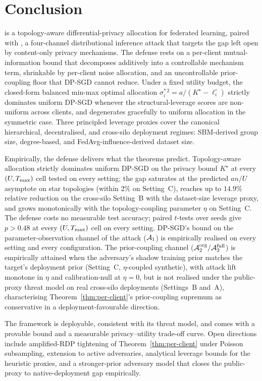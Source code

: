 \section{Conclusion}
\label{sec:conclusion}

\Fulcrum is a topology-aware differential-privacy allocation for
federated learning, paired with \TADI, a four-channel distributional
inference attack that targets the gap left open by content-only privacy
mechanisms. The defense rests on a per-client mutual-information bound
that decomposes additively into a controllable mechanism term,
shrinkable by per-client noise allocation, and an uncontrollable
prior-coupling floor that DP-SGD cannot reduce. Under a fixed utility
budget, the closed-form balanced min-max optimal allocation
$\sigma_i^{*\,2} = a/(K^\star - \ell_i^\circ)$ strictly dominates
uniform DP-SGD whenever the structural-leverage scores are non-uniform
across clients, and degenerates gracefully to uniform allocation in the
symmetric case. Three principled leverage proxies cover the canonical hierarchical,
decentralised, and cross-silo deployment regimes: SBM-derived group
size, degree-based, and FedAvg-influence-derived dataset size.

Empirically, the defense delivers what the theorems predict.
Topology-aware allocation strictly dominates uniform DP-SGD on the
privacy bound $K^\star$ at every $(U, T_{\max})$ cell tested on every
setting; the gap saturates at the predicted $an/U$ asymptote on
star topologies (within 2\% on Setting~C), reaches up to $14.9\%$
relative reduction on the cross-silo Setting~B with the dataset-size
leverage proxy, and grows monotonically with the topology-coupling
parameter $\eta$ on Setting~C. The defense costs no measurable test
accuracy; paired $t$-tests over seeds give $p > 0.48$ at every
$(U, T_{\max})$ cell on every setting. DP-SGD's bound on the
parameter-observation channel of the \TADI attack ($\mathcal{A}_1$) is
empirically realised on every setting and every configuration. The
prior-coupling channel ($\mathcal{A}_2^{\text{org}} / \mathcal{A}_2^{\text{full}}$)
is empirically attained when the adversary's shadow training prior
matches the target's deployment prior (Setting~C, $\eta$-coupled
synthetic), with attack lift monotone in $\eta$ and calibration-null at
$\eta=0$, but is not realised under the public-proxy threat model
on real cross-silo deployments (Settings~B and~A), characterising
Theorem~\ref{thm:per-client}'s prior-coupling supremum as conservative
in a deployment-favourable direction.

The framework is deployable, consistent with its threat model, and
comes with a provable bound and a measurable privacy--utility trade-off
curve. Open directions include amplified-RDP tightening of
Theorem~\ref{thm:per-client} under Poisson subsampling, extension to
active adversaries, analytical leverage bounds for the heuristic
proxies, and a stronger-prior adversary model that closes the
public-proxy to native-deployment gap empirically.

